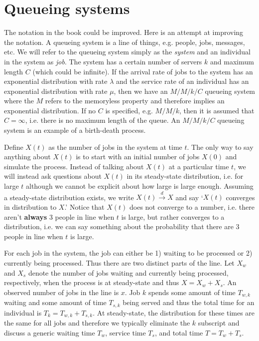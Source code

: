 \documentclass{article}
\begin{document}
\section{Queueing systems}

The notation in the book could be improved. Here is an attempt at improving the notation. A queueing system is a line of things, e.g. people, jobs, messages, etc. We will refer to the queueing system simply as the \emph{system} and an individual in the system as \emph{job}. The system has a certain number of servers $k$ and maximum length $C$ (which could be infinite). If the arrival rate of jobs to the system has an exponential distribution with rate $\lambda$ and the service rate of an individual has an exponential distribution with rate $\mu$, then we have an $M/M/k/C$ queueing system where the $M$ refers to the memoryless property and therefore implies an exponential distribution. If no $C$ is specified, e.g. $M/M/k$, then it is assumed that $C=\infty$, i.e. there is no maximum length of the queue. An $M/M/k/C$ queueing system is an example of a birth-death process. 

Define $X(t)$ as the number of jobs in the system at time $t$. The only way to say anything about $X(t)$ is to start with an initial number of jobs $X(0)$ and simulate the process. Instead of talking about $X(t)$ at a particular time $t$, we will instead ask questions about $X(t)$ in its steady-state distribution, i.e. for large $t$ although we cannot be explicit about how large is large enough. Assuming a steady-state distribution exists, we write $X(t)\stackrel{d}{\rightarrow} X$ and say `$X(t)$ converges in distribution to $X$.' Notice that $X(t)$ does not converge to a number, i.e. there aren't {\bf always} 3 people in line when $t$ is large, but rather converges to a distribution, i.e. we can say something about the probability that there are 3 people in line when $t$ is large. 

For each job in the system, the job can either be 1) waiting to be processed or 2) currently being processed. Thus there are two distinct parts of the line. Let $X_w$ and $X_s$ denote the number of jobs waiting and currently being processed, respectively, when the process is at steady-state and thus $X=X_w+X_s$. An observed number of jobs in the line is $x$. Job $k$ spends some amount of time $T_{w,k}$ waiting and some amount of time $T_{s,k}$ being served and thus the total time for an individual is $T_k=T_{w,k}+T_{s,k}$. At steady-state, the distribution for these times are the same for all jobs and therefore we typically eliminate the $k$ subscript and discuss a generic waiting time $T_w$, service time $T_s$, and total time $T=T_w+T_s$.  
\end{document}
